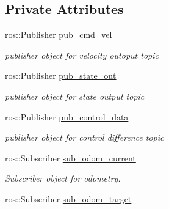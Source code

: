\subsection*{Private Attributes}
\begin{DoxyCompactItemize}
\item 
ros\+::\+Publisher \hyperlink{classController_a2ff92c110ca7f28bdd702229a1295505}{pub\+\_\+cmd\+\_\+vel}\hypertarget{classController_a2ff92c110ca7f28bdd702229a1295505}{}\label{classController_a2ff92c110ca7f28bdd702229a1295505}

\begin{DoxyCompactList}\small\item\em publisher object for velocity outoput topic \end{DoxyCompactList}\item 
ros\+::\+Publisher \hyperlink{classController_a6abeaf23d1c17d6af6eecf7d1479fe31}{pub\+\_\+state\+\_\+out}\hypertarget{classController_a6abeaf23d1c17d6af6eecf7d1479fe31}{}\label{classController_a6abeaf23d1c17d6af6eecf7d1479fe31}

\begin{DoxyCompactList}\small\item\em publisher object for state output topic \end{DoxyCompactList}\item 
ros\+::\+Publisher \hyperlink{classController_afde3eefcf7ac040b2a38a8d1e95a6077}{pub\+\_\+control\+\_\+data}\hypertarget{classController_afde3eefcf7ac040b2a38a8d1e95a6077}{}\label{classController_afde3eefcf7ac040b2a38a8d1e95a6077}

\begin{DoxyCompactList}\small\item\em publisher object for control difference topic \end{DoxyCompactList}\item 
ros\+::\+Subscriber \hyperlink{classController_a855093341ac8afa84efd841654fedaf5}{sub\+\_\+odom\+\_\+current}\hypertarget{classController_a855093341ac8afa84efd841654fedaf5}{}\label{classController_a855093341ac8afa84efd841654fedaf5}

\begin{DoxyCompactList}\small\item\em Subscriber object for odometry. \end{DoxyCompactList}\item 
ros\+::\+Subscriber \hyperlink{classController_a7c21cd887b80a3ebceae1e5e320c6ad8}{sub\+\_\+odom\+\_\+target}\hypertarget{classController_a7c21cd887b80a3ebceae1e5e320c6ad8}{}\label{classController_a7c21cd887b80a3ebceae1e5e320c6ad8}


\end{DoxyCompactItemize}

